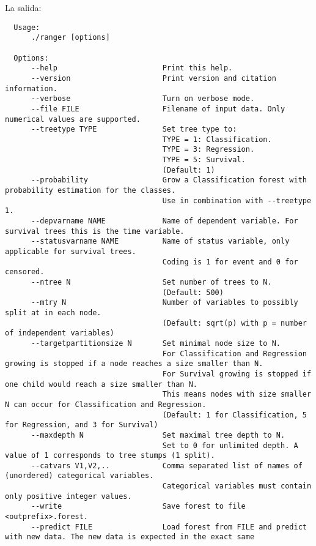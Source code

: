 \documentclass[12pt,oneside]{book}
\begin{document}
La salida:
\begin{lstlisting}
  Usage: 
      ./ranger [options]
  
  Options:
      --help                        Print this help.
      --version                     Print version and citation information.
      --verbose                     Turn on verbose mode.
      --file FILE                   Filename of input data. Only numerical values are supported.
      --treetype TYPE               Set tree type to:
                                    TYPE = 1: Classification.
                                    TYPE = 3: Regression.
                                    TYPE = 5: Survival.
                                    (Default: 1)
      --probability                 Grow a Classification forest with probability estimation for the classes.
                                    Use in combination with --treetype 1.
      --depvarname NAME             Name of dependent variable. For survival trees this is the time variable.
      --statusvarname NAME          Name of status variable, only applicable for survival trees.
                                    Coding is 1 for event and 0 for censored.
      --ntree N                     Set number of trees to N.
                                    (Default: 500)
      --mtry N                      Number of variables to possibly split at in each node.
                                    (Default: sqrt(p) with p = number of independent variables)
      --targetpartitionsize N       Set minimal node size to N.
                                    For Classification and Regression growing is stopped if a node reaches a size smaller than N.
                                    For Survival growing is stopped if one child would reach a size smaller than N.
                                    This means nodes with size smaller N can occur for Classification and Regression.
                                    (Default: 1 for Classification, 5 for Regression, and 3 for Survival)
      --maxdepth N                  Set maximal tree depth to N.
                                    Set to 0 for unlimited depth. A value of 1 corresponds to tree stumps (1 split).
      --catvars V1,V2,..            Comma separated list of names of (unordered) categorical variables. 
                                    Categorical variables must contain only positive integer values.
      --write                       Save forest to file <outprefix>.forest.
      --predict FILE                Load forest from FILE and predict with new data. The new data is expected in the exact same 

\end{lstlisting}
\end{document}
